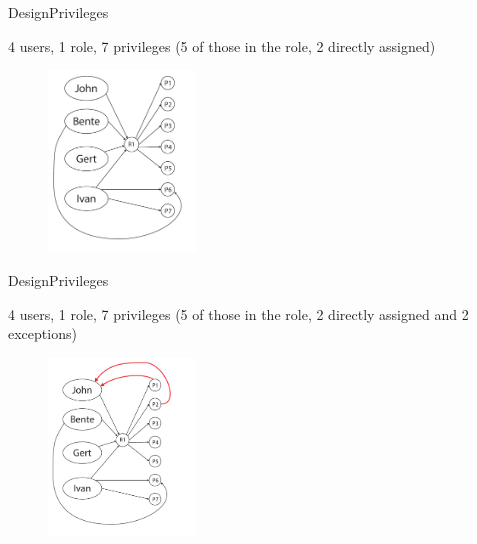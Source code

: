 \begin{frame}{Design}{Privileges}
  \begin{block}{}
  	4 users, 1 role, 7 privileges (5 of those in the role, 2 directly assigned)

  	\begin{figure}[htb]
    	\centering
    	\includegraphics[width=0.35\textwidth]{images/privileges4.pdf}
  	\end{figure}
  \end{block}
\end{frame}

\begin{frame}{Design}{Privileges}
  \begin{block}{}
  	4 users, 1 role, 7 privileges (5 of those in the role, 2 directly assigned and 2 exceptions)

  	\begin{figure}[htb]
    	\centering
    	\includegraphics[width=0.35\textwidth]{images/privileges5.pdf}
  	\end{figure}
  \end{block}
\end{frame}



